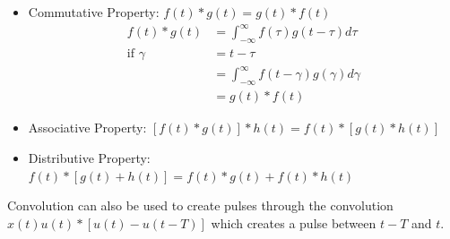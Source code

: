 \documentclass[nobib]{tufte-handout}
\begin{document}
\begin{itemize}
    \item Commutative Property: $f(t)*g(t)=g(t)*f(t)$
          \begin{align*}
              f(t)*g(t)         & = \int_{-\infty}^{\infty}f(\tau)g(t-\tau)d\tau       \\
              \text{if } \gamma & =t-\tau                                              \\
                                & = \int_{-\infty}^{\infty}f(t-\gamma)g(\gamma)d\gamma \\
                                & = g(t)*f(t)
          \end{align*}
    \item Associative Property: $[f(t)*g(t)]*h(t) = f(t)*[g(t)*h(t)]$
    \item Distributive Property: $f(t)*[g(t)+h(t)]=f(t)*g(t)+f(t)*h(t)$
\end{itemize}
Convolution can also be used to create pulses through the convolution $x(t)u(t)*[u(t)-u(t-T)]$ which creates a pulse between $t-T$ and $t$.\\
\end{document}
